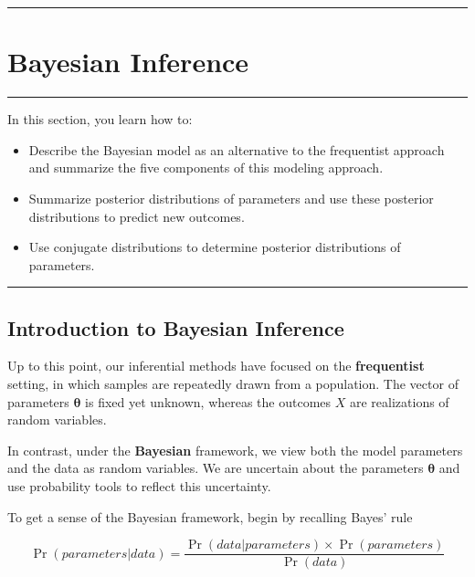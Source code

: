\documentclass[]{book}
\providecommand{\tightlist}{%
  \setlength{\itemsep}{0pt}\setlength{\parskip}{0pt}}
\theoremstyle{definition}
\theoremstyle{definition}
\theoremstyle{definition}
\theoremstyle{remark}
\begin{document}
\begin{center}\rule{0.5\linewidth}{\linethickness}\end{center}

\section{Bayesian Inference}\label{S:MS:BayesInference}

\begin{center}\rule{0.5\linewidth}{\linethickness}\end{center}

In this section, you learn how to:

\begin{itemize}
\tightlist
\item
  Describe the Bayesian model as an alternative to the frequentist
  approach and summarize the five components of this modeling approach.
\item
  Summarize posterior distributions of parameters and use these
  posterior distributions to predict new outcomes.
\item
  Use conjugate distributions to determine posterior distributions of
  parameters.
\end{itemize}

\begin{center}\rule{0.5\linewidth}{\linethickness}\end{center}

\subsection{Introduction to Bayesian Inference}\label{S:IntroBayes}

Up to this point, our inferential methods have focused on the
\textbf{frequentist} setting, in which samples are repeatedly drawn from
a population. The vector of parameters \(\boldsymbol \theta\) is fixed
yet unknown, whereas the outcomes \(X\) are realizations of random
variables.

In contrast, under the \textbf{Bayesian} framework, we view both the
model parameters and the data as random variables. We are uncertain
about the parameters \(\boldsymbol \theta\) and use probability tools to
reflect this uncertainty.

To get a sense of the Bayesian framework, begin by recalling Bayes' rule

\[
\Pr(parameters|data) = \frac{\Pr(data|parameters) \times \Pr(parameters)}{\Pr(data)}
\]
\end{document}
